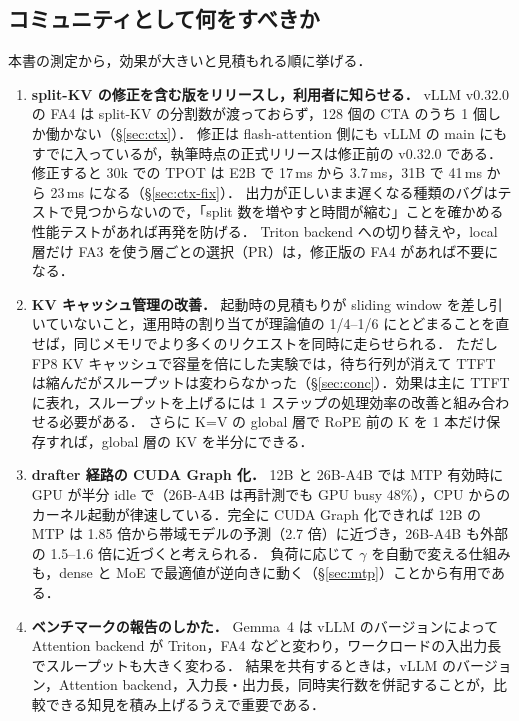 \subsection{コミュニティとして何をすべきか}
本書の測定から，効果が大きいと見積もれる順に挙げる．
\begin{enumerate}
\item \textbf{split-KV の修正を含む版をリリースし，利用者に知らせる．}
      vLLM v0.32.0 の FA4 は split-KV の分割数が渡っておらず，128 個の CTA のうち 1 個しか働かない（\S\ref{sec:ctx}）．
      修正は flash-attention 側にも vLLM の main にもすでに入っているが，執筆時点の正式リリースは修正前の v0.32.0 である．
      修正すると 30k での TPOT は E2B で 17\,ms から 3.7\,ms，31B で 41\,ms から 23\,ms になる（\S\ref{sec:ctx-fix}）．
      出力が正しいまま遅くなる種類のバグはテストで見つからないので，「split 数を増やすと時間が縮む」ことを確かめる性能テストがあれば再発を防げる．
      Triton backend への切り替えや，local 層だけ FA3 を使う層ごとの選択（PR\cite{vllmpr38891}）は，修正版の FA4 があれば不要になる．
\item \textbf{KV キャッシュ管理の改善．}
      起動時の見積もりが sliding window を差し引いていないこと，運用時の割り当てが理論値の 1/4--1/6 にとどまることを直せば，同じメモリでより多くのリクエストを同時に走らせられる．
      ただし FP8 KV キャッシュで容量を倍にした実験では，待ち行列が消えて TTFT は縮んだがスループットは変わらなかった（\S\ref{sec:conc}）．効果は主に TTFT に表れ，スループットを上げるには 1 ステップの処理効率の改善と組み合わせる必要がある．
      さらに K=V の global 層で RoPE 前の K を 1 本だけ保存すれば，global 層の KV を半分にできる．
\item \textbf{drafter 経路の CUDA Graph 化．}
      12B と 26B-A4B では MTP 有効時に GPU が半分 idle で（26B-A4B は再計測でも GPU busy 48\%），CPU からのカーネル起動が律速している．完全に CUDA Graph 化できれば 12B の MTP は 1.85 倍から帯域モデルの予測（2.7 倍）に近づき，26B-A4B も外部の 1.5--1.6 倍に近づくと考えられる．
      負荷に応じて $\gamma$ を自動で変える仕組みも，dense と MoE で最適値が逆向きに動く（\S\ref{sec:mtp}）ことから有用である．
\item \textbf{ベンチマークの報告のしかた．}
      Gemma~4 は vLLM のバージョンによって Attention backend が Triton，FA4 などと変わり，ワークロードの入出力長でスループットも大きく変わる．
      結果を共有するときは，vLLM のバージョン，Attention backend，入力長・出力長，同時実行数を併記することが，比較できる知見を積み上げるうえで重要である．
\end{enumerate}

